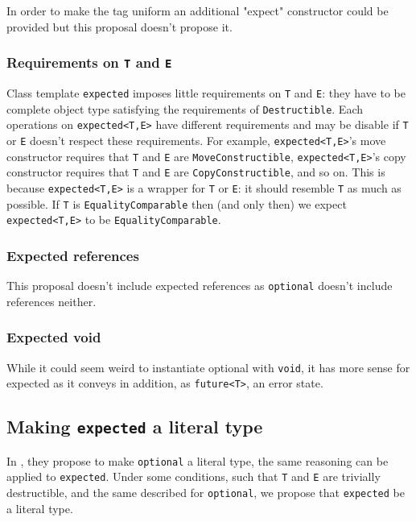 \documentclass[a4paper,10pt]{article}
\newcommand{\cpp}[1]{\lstinline{#1}}
\begin{document}
In order to make the tag uniform an additional "expect" constructor could be provided but this proposal doesn't propose it.

\subsubsection{Requirements on \cpp{T} and \cpp{E}}

Class template \cpp{expected} imposes little requirements on \cpp{T} and \cpp{E}: they have to be  complete object type satisfying the requirements of \cpp{Destructible}. Each operations on \cpp{expected<T,E>} have different requirements and may be disable if \cpp{T} or \cpp{E} doesn't respect these requirements. For example, \cpp{expected<T,E>}'s move constructor requires that \cpp{T} and \cpp{E} are \cpp{MoveConstructible}, \cpp{expected<T,E>}'s copy constructor requires that \cpp{T} and \cpp{E} are \cpp{CopyConstructible}, and so on. This is because \cpp{expected<T,E>} is a wrapper for \cpp{T} or \cpp{E}: it should resemble \cpp{T} as much as possible. If \cpp{T} is \cpp{EqualityComparable} then (and only then) we expect \cpp{expected<T,E>} to be \cpp{EqualityComparable}. 

\subsubsection{Expected references}

This proposal doesn't include expected references as \cpp{optional}\cite{OptionalRev5} doesn't include references neither.

\subsubsection{Expected void}

While it could seem weird to instantiate optional with \cpp{void}, it has more sense for expected as it conveys in addition, as \cpp{future<T>}, an error state.

\subsection{Making \cpp{expected} a literal type}

In \cite{OptionalRev4}, they propose to make \cpp{optional} a literal type, the same reasoning can be applied to \cpp{expected}. Under some conditions, such that \cpp{T} and \cpp{E} are trivially destructible, and the same described for \cpp{optional}, we propose that \cpp{expected} be a literal type.
\end{document}
